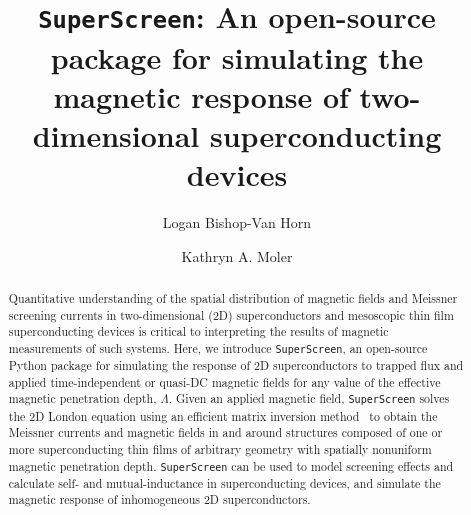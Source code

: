 \documentclass[final,3p,times,twocolumn]{elsarticle}
\newcommand{\inline}[1]{\texttt{#1}\xspace}
\newcommand{\SuperScreen}{\inline{SuperScreen}}
\begin{document}
\begin{frontmatter}



\title{\texttt{SuperScreen}: An open-source package for simulating the magnetic response of two-dimensional superconducting devices}


\author[PHYS,SIMES]{Logan Bishop-Van Horn}
\author[PHYS,AP,SIMES]{Kathryn A. Moler}


\address[PHYS]{Department of Physics, Stanford University, Stanford, California 94305, USA}
\address[AP]{Department of Applied Physics, Stanford University, Stanford, California 94305, USA}
\address[SIMES]{Stanford Institute for Materials and Energy Sciences, SLAC National Accelerator Laboratory, 2575 Sand Hill Road, Menlo Park, California 94025, USA}

\begin{abstract}
Quantitative understanding of the spatial distribution of magnetic fields and Meissner screening currents in two-dimensional (2D) superconductors and mesoscopic thin film superconducting devices is critical to interpreting the results of magnetic measurements of such systems. Here, we introduce \SuperScreen, an open-source Python package for simulating the response of 2D superconductors to trapped flux and applied time-independent or quasi-DC magnetic fields for any value of the effective magnetic penetration depth, $\Lambda$. Given an applied magnetic field, \SuperScreen solves the 2D London equation using an efficient matrix inversion method~\cite{Brandt2004-ew, Brandt2005-wj} to obtain the Meissner currents and magnetic fields in and around structures composed of one or more superconducting thin films of arbitrary geometry with spatially nonuniform magnetic penetration depth. \SuperScreen can be used to model screening effects and calculate self- and mutual-inductance in superconducting devices, and simulate the magnetic response of inhomogeneous 2D superconductors.
\end{abstract}


\end{frontmatter}
\end{document}
